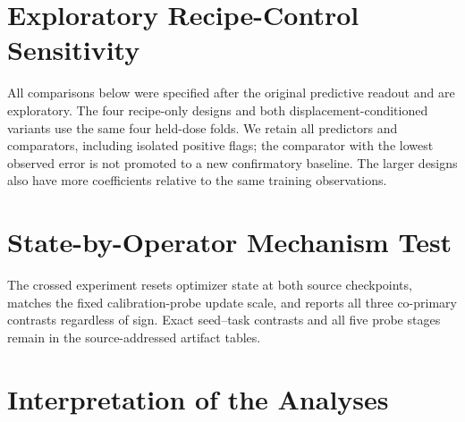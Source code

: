 \documentclass[11pt]{article}
\begin{document}
\DimensionUtilizationAppendixTable

\section{Exploratory Recipe-Control Sensitivity}

All comparisons below were specified after the original predictive readout and are exploratory.
The four recipe-only designs and both displacement-conditioned variants use the same four
held-dose folds. We retain all predictors and comparators, including isolated positive flags;
the comparator with the lowest observed error is not promoted to a new confirmatory baseline.
The larger designs also have more coefficients relative to the same training observations.

\WeightRecipeSensitivityTable

\FunctionalRecipeSensitivityTable

\section{State-by-Operator Mechanism Test}

The crossed experiment resets optimizer state at both source checkpoints, matches the fixed
calibration-probe update scale, and reports all three co-primary contrasts regardless of sign.
Exact seed--task contrasts and all five probe stages remain in the source-addressed artifact tables.

\StateOperatorAppendixTable

\FloatBarrier

\section{Interpretation of the Analyses}
\end{document}
